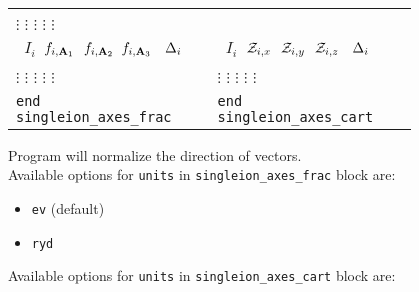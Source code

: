 \documentclass[10pt]{report}
\begin{document}
\begin{itemize}
\begin{center}
\begin{tabular}{p{0.4\linewidth}p{0.4\linewidth}}
           \hspace{0.3cm}  $\vdots$ \hspace{0.9cm}    $\vdots$ \hspace{0.45cm} $\vdots$ \hspace{0.55cm} $\vdots$ \hspace{0.4cm} $\vdots$ \\
        {\tt \hspace{0.2cm} $I_{i}$\hspace{0.35cm}  $ f_{i,\textbf{A}_1} \hspace{0.25cm} f_{i,\textbf{A}_2} \hspace{0.2cm} f_{i,\textbf{A}_3} \hspace{0.35cm} \Delta_{i} $}  &
        {\tt \hspace{0.2cm} $I_{i}$\hspace{0.35cm}  $ \mathcal{Z}_{i,x} \hspace{0.25cm} \mathcal{Z}_{i,y} \hspace{0.25cm} \mathcal{Z}_{i,z}\hspace{0.35cm} \Delta_{i} $}  \\
           \hspace{0.3cm}  $\vdots$ \hspace{0.9cm}    $\vdots$ \hspace{0.45cm} $\vdots$ \hspace{0.45cm} $\vdots$ \hspace{0.55cm} $\vdots$             &   
           \hspace{0.3cm}  $\vdots$ \hspace{0.9cm}    $\vdots$ \hspace{0.45cm} $\vdots$ \hspace{0.55cm} $\vdots$ \hspace{0.4cm} $\vdots$ \\
        {\tt end singleion\_axes\_frac}    & {\tt end singleion\_axes\_cart} \\
        \bottomrule
    \end{tabular}
\end{center}
Program will normalize the direction of vectors.\\
Available options for {\tt units} in {\tt singleion\_axes\_frac} block are: 
\begin{itemize} [label=\adfhalfrightarrowhead]
\item {\tt ev} (default)
\item {\tt ryd}
\end{itemize}
Available options for {\tt units} in {\tt singleion\_axes\_cart} block are: 

\end{itemize}
\end{document}
